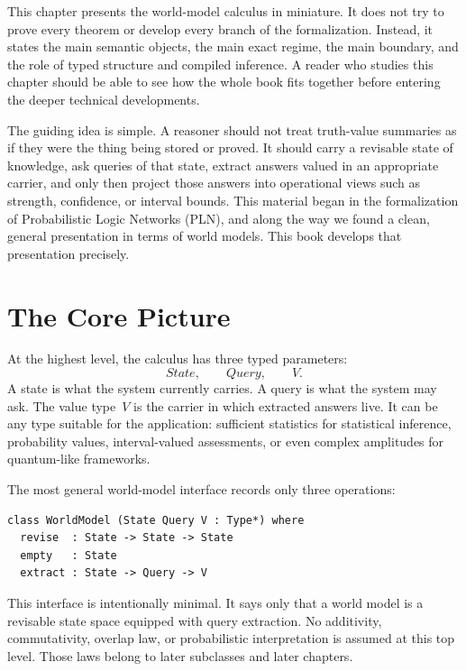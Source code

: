 This chapter presents the world-model calculus in miniature.  It does not try
to prove every theorem or develop every branch of the formalization.  Instead,
it states the main semantic objects, the main exact regime, the main boundary,
and the role of typed structure and compiled inference.  A reader who studies
this chapter should be able to see how the whole book fits together before
entering the deeper technical developments.

The guiding idea is simple.  A reasoner should not treat truth-value
summaries as if they were the thing being stored or proved.  It should
carry a revisable state of knowledge, ask queries of that state, extract
answers valued in an appropriate carrier, and only then project those
answers into operational views such as strength, confidence, or interval
bounds.  This material began in the formalization of Probabilistic Logic
Networks (PLN), and along the way we found a clean, general presentation
in terms of world models.  This book develops that presentation
precisely.

\section{The Core Picture}
\label{sec:overview-core-picture}

At the highest level, the calculus has three typed parameters:
\[
  \textit{State}, \qquad \textit{Query}, \qquad V.
\]
A state is what the system currently carries.  A query is what the
system may ask.  The value type~$V$ is the carrier in which extracted
answers live.  It can be any type suitable for the application:
sufficient statistics for statistical inference, probability values,
interval-valued assessments, or even complex amplitudes for
quantum-like frameworks.

The most general world-model interface records only three operations:

\begin{lstlisting}[language={}]
class WorldModel (State Query V : Type*) where
  revise  : State -> State -> State
  empty   : State
  extract : State -> Query -> V
\end{lstlisting}

This interface is intentionally minimal.  It says only that a world model is a
revisable state space equipped with query extraction.  No additivity,
commutativity, overlap law, or probabilistic interpretation is assumed at this
top level.  Those laws belong to later subclasses and later chapters.

